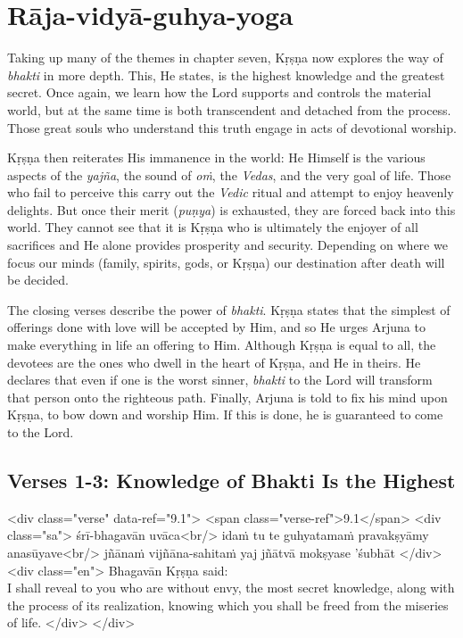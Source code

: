 \chapter{Rāja-vidyā-guhya-yoga}\label{chap-raja-vidya-guhya-yoga}



\noindent Taking up many of the themes in chapter seven, Kṛṣṇa now explores the way of \textit{bhakti} in more depth. This, He states, is the highest knowledge and the greatest secret. Once again, we learn how the Lord supports and controls the material world, but at the same time is both transcendent and detached from the process. Those great souls who understand this truth engage in acts of devotional worship.

Kṛṣṇa then reiterates His immanence in the world: He Himself is the various aspects of the \textit{yajña}, the sound of \textit{oṁ}, the \textit{Vedas}, and the very goal of life. Those who fail to perceive this carry out the \textit{Vedic} ritual and attempt to enjoy heavenly delights. But once their merit (\textit{puṇya}) is exhausted, they are forced back into this world. They cannot see that it is Kṛṣṇa who is ultimately the enjoyer of all sacrifices and He alone provides prosperity and security. Depending on where we focus our minds (family, spirits, gods, or Kṛṣṇa) our destination after death will be decided.

The closing verses describe the power of \textit{bhakti}. Kṛṣṇa states that the simplest of offerings done with love will be accepted by Him, and so He urges Arjuna to make everything in life an offering to Him. Although Kṛṣṇa is equal to all, the devotees are the ones who dwell in the heart of Kṛṣṇa, and He in theirs. He declares that even if one is the worst sinner, \textit{bhakti} to the Lord will transform that person onto the righteous path. Finally, Arjuna is told to fix his mind upon Kṛṣṇa, to bow down and worship Him. If this is done, he is guaranteed to come to the Lord.

\section{Verses 1-3: Knowledge of Bhakti Is the Highest}\label{sec-verses-1-3-knowledge-of-bhakti-is-the-highest}


\begin{html}
<div class="verse" data-ref="9.1">
  <span class="verse-ref">9.1</span>
  <div class="sa">
    śrī-bhagavān uvāca<br/>
    idaṁ tu te guhyatamaṁ pravakṣyāmy anasūyave<br/>
    jñānaṁ vijñāna-sahitaṁ yaj jñātvā mokṣyase ’śubhāt
  </div>
  <div class="en">
    \hspace*{1em}Bhagavān Kṛṣṇa said: \\ I shall reveal to you who are without envy, the most secret knowledge, along with the process of its realization, knowing which you shall be freed from the miseries of life.
  </div>
</div>
\end{html}



